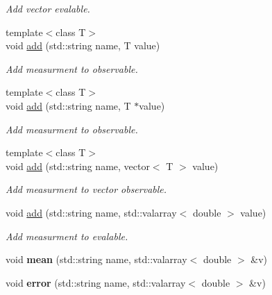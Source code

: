 \begin{CompactItemize}
\begin{CompactList}\small\item\em Add vector evalable. \item\end{CompactList}\item 
{\footnotesize template$<$class T$>$ }\\void \hyperlink{classmeasurements_e1ac4a3f40e78a0e2e8b71208d4d1313}{add} (std::string name, T value)
\begin{CompactList}\small\item\em Add measurment to observable. \item\end{CompactList}\item 
{\footnotesize template$<$class T$>$ }\\void \hyperlink{classmeasurements_c2a7e804a30825d77c111892ead6fc2c}{add} (std::string name, T $\ast$value)
\begin{CompactList}\small\item\em Add measurment to observable. \item\end{CompactList}\item 
{\footnotesize template$<$class T$>$ }\\void \hyperlink{classmeasurements_425cb494200db7a39e99f37dfdfa23bc}{add} (std::string name, vector$<$ T $>$ value)
\begin{CompactList}\small\item\em Add measurment to vector observable. \item\end{CompactList}\item 
void \hyperlink{classmeasurements_4ec8503130241dbe69551d91c16ae493}{add} (std::string name, std::valarray$<$ double $>$ value)
\begin{CompactList}\small\item\em Add measurment to evalable. \item\end{CompactList}\item 
\hypertarget{classmeasurements_105b420f3481c6bc3a55cbfa9f90ead1}{
void \textbf{mean} (std::string name, std::valarray$<$ double $>$ \&v)}
\label{classmeasurements_105b420f3481c6bc3a55cbfa9f90ead1}

\item 
\hypertarget{classmeasurements_2e627e0451a89c13412025a6486e4455}{
void \textbf{error} (std::string name, std::valarray$<$ double $>$ \&v)}
\label{classmeasurements_2e627e0451a89c13412025a6486e4455}


\end{CompactItemize}
